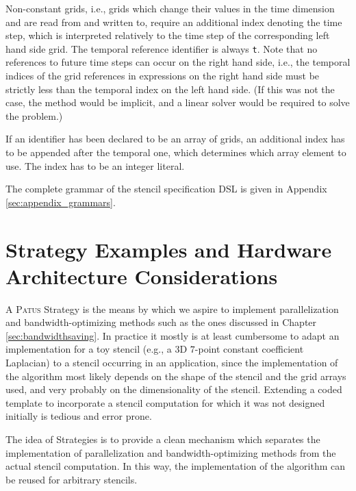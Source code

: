 Non-constant grids, i.e., grids which change their values in the time dimension and are read from and written to,
require an additional index denoting the time step, which is interpreted relatively to the time step of the
corresponding left hand side grid. The temporal reference identifier is always \texttt{t}.
Note that no references to future time steps can occur on the right hand side, i.e., the temporal
indices of the grid references in expressions on the right hand side must be strictly less than the temporal index on
the left hand side. (If this was not the case, the method would be implicit, and a linear solver would be
required to solve the problem.)

If an identifier has been declared to be an array of grids, an additional index has to be appended after the
temporal one, which determines which array element to use. The index has to be an integer literal.

The complete grammar of the stencil specification DSL is given in Appendix \ref{sec:appendix_grammars}.


\chapter[Strategies and Hardware Architectures]{Strategy Examples and Hardware Architecture Considerations}

A \textsc{Patus} Strategy is the means by which we aspire to implement parallelization and bandwidth-optimizing methods
such as the ones discussed in Chapter \ref{sec:bandwidthsaving}.
In practice it mostly is at least cumbersome to adapt an implementation for a toy stencil (e.g., a 3D $7$-point
constant coefficient Laplacian) to a stencil occurring in an application, since the implementation of the algorithm
most likely depends on the shape of the stencil and the grid arrays used, and very probably on the dimensionality
of the stencil. Extending a coded template to incorporate a stencil computation for which it was not designed
initially is tedious and error prone.

The idea of Strategies is to provide a clean mechanism which separates
the implementation of parallelization and bandwidth-optimizing methods from the actual stencil computation.
In this way, the implementation of the algorithm can be reused for arbitrary stencils.


